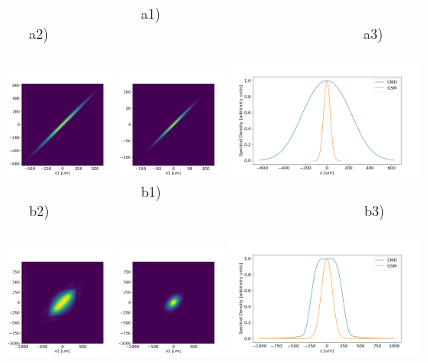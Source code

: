 \documentclass{iopconfser}
\begin{document}
\begin{figure}[H]
    \centering
    ~~~~~~~~~~~~~~~~~~~a1)~~~~~~~~~~~~~~~~~~~~~~~~~~~~~~~~~~~~~~~~~a2)~~~~~~~~~~~~~~~~~~~~~~~~~~~~~~~~~~~~~~~~~~~~~a3)~~~~~~~~~~~~~~~~~~~~~~~~~~~~~~~~~~~~~~~~~\\
    \includegraphics[width=0.25\textwidth]{figures/CMD_H-propagated.png}
    \includegraphics[width=0.25\textwidth]{figures/GSM_H-propagated.png}
    \includegraphics[width=0.45\textwidth]{figures/SD_H-propagated.png}\\
~~~~~~~~~~~~~~~~~~~b1)~~~~~~~~~~~~~~~~~~~~~~~~~~~~~~~~~~~~~~~~~b2)~~~~~~~~~~~~~~~~~~~~~~~~~~~~~~~~~~~~~~~~~~~~~b3)~~~~~~~~~~~~~~~~~~~~~~~~~~~~~~~~~~~~~~~~~\\
    \includegraphics[width=0.25\textwidth]{figures/CMD_V-propagated.png}
    \includegraphics[width=0.25\textwidth]{figures/GSM_V-propagated.png}
    \includegraphics[width=0.45\textwidth]{figures/SD_V-propagated.png}


\end{figure}
\end{document}
